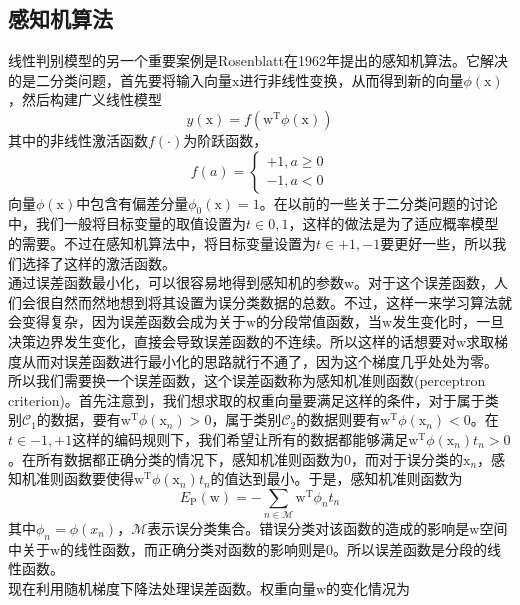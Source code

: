 \documentclass[b5paper]{book}
\numberwithin{equation}{chapter}
\newcommand {\bx} {\boldsymbol{\mathrm{x}}}
\newcommand {\bw} {\boldsymbol{\mathrm{w}}}
\newcommand {\rmT} {\mathrm{T}}
\begin{document}
	\subsection{感知机算法}
	\textnormal{线性判别模型的另一个重要案例是Rosenblatt在1962年提出的感知机算法。它解决的是二分类问题，首先要将输入向量$\bx$进行非线性变换，从而得到新的向量$\phi(\bx)$，然后构建广义线性模型
	\begin{equation}
		y(\bx) = f\left(\bw^{\rmT}\phi(\bx)\right)
	\end{equation}
	其中的非线性激活函数$f(\cdot)$为阶跃函数，
	\begin{equation}
		f(a) = \left\{ \begin{matrix} 
			+1, a \geqslant 0 \\
			-1, a < 0
		\end{matrix}\right.
	\end{equation}
	向量$\phi(\bx)$中包含有偏差分量$\phi_0(\bx) = 1$。在以前的一些关于二分类问题的讨论中，我们一般将目标变量的取值设置为$t \in {0,1}$，这样的做法是为了适应概率模型的需要。不过在感知机算法中，将目标变量设置为$t \in {+1, -1}$要更好一些，所以我们选择了这样的激活函数。\\
	\indent 通过误差函数最小化，可以很容易地得到感知机的参数$\bw$。对于这个误差函数，人们会很自然而然地想到将其设置为误分类数据的总数。不过，这样一来学习算法就会变得复杂，因为误差函数会成为关于$\bw$的分段常值函数，当$\bw$发生变化时，一旦决策边界发生变化，直接会导致误差函数的不连续。所以这样的话想要对$\bw$求取梯度从而对误差函数进行最小化的思路就行不通了，因为这个梯度几乎处处为零。\\
	\indent 所以我们需要换一个误差函数，这个误差函数称为感知机准则函数(perceptron criterion)。首先注意到，我们想求取的权重向量要满足这样的条件，对于属于类别$\mathcal{C}_1$的数据，要有$\bw^{\rmT}\phi(\bx_n)>0$，属于类别$\mathcal{C}_2$的数据则要有$\bw^{\rmT}\phi(\bx_n)<0$。在$t \in {-1, +1}$这样的编码规则下，我们希望让所有的数据都能够满足$\bw^{\rmT}\phi(\bx_n)t_n > 0$。在所有数据都正确分类的情况下，感知机准则函数为0，而对于误分类的$\bx_n$，感知机准则函数要使得$\bw^{\rmT}\phi(\bx_n)t_n$的值达到最小。于是，感知机准则函数为
	\begin{equation}
		E_\mathrm{P}(\bw) = -\sum_{n \in \mathcal{M}}\bw^{\rmT}\phi_n t_n
	\end{equation}
	其中$\phi_n = \phi(x_n)$，$\mathcal{M}$表示误分类集合。错误分类对该函数的造成的影响是$\bw$空间中关于$\bw$的线性函数，而正确分类对函数的影响则是0。所以误差函数是分段的线性函数。\\
	\indent 现在利用随机梯度下降法处理误差函数。权重向量$\bw$的变化情况为
}
\end{document}
